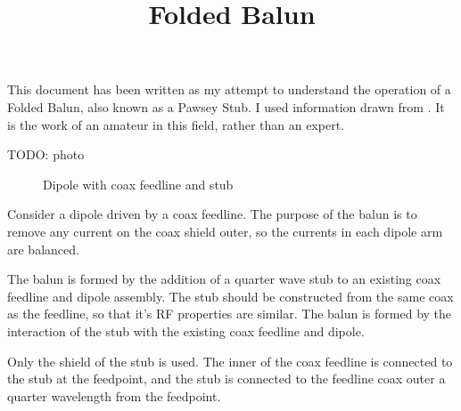 \documentclass{article}
\begin{document}
\title{Folded Balun}
\maketitle

This document has been written as my attempt to understand the operation of a Folded Balun, also known as a Pawsey Stub.  I used information drawn from \cite{stack_exchange}\cite{antenna_theory}\cite{duffey}.  It is the work of an amateur in this field, rather than an expert.

TODO: photo

\begin{figure}[h]
\caption{Dipole with coax feedline and stub}
\label{fig:assembly}
\vspace{5mm}

\end{figure}

Consider a dipole driven by a coax feedline.  The purpose of the balun is to remove any current on the coax shield outer, so the currents in each dipole arm are balanced.

The balun is formed by the addition of a quarter wave stub to an existing coax feedline and dipole assembly.  The stub should be constructed from the same coax as the feedline, so that it's RF properties are similar.  The balun is formed by the interaction of the stub with the existing coax feedline and dipole.

Only the shield of the stub is used.  The inner of the coax feedline is connected to the stub at the feedpoint, and the stub is connected to the feedline coax outer a quarter wavelength from the feedpoint.
\end{document}
